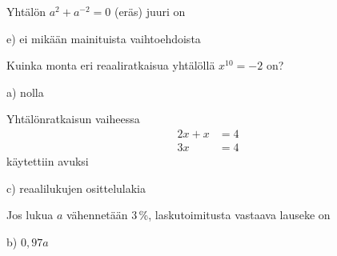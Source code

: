 \begin{tehtava} %
Yhtälön $a^2+a^{-2}=0$ (eräs) juuri on
	\begin{vastaus}
e) ei mikään mainituista vaihtoehdoista
	\end{vastaus}
\end{tehtava}

\begin{tehtava}
Kuinka monta eri reaaliratkaisua yhtälöllä $x^{10}=-2$ on?
	\begin{vastaus}
a) nolla
	\end{vastaus}
\end{tehtava}

\begin{tehtava}
Yhtälönratkaisun vaiheessa
\begin{align*}
2x+x&=4 \\
3x&=4
\end{align*}
käytettiin avuksi
	\begin{vastaus}
	c) reaalilukujen osittelulakia
	\end{vastaus}
\end{tehtava}

%
%	
%
%
%	
%
%
%	

\begin{tehtava}
Jos lukua $a$ vähennetään $3$\,\%, laskutoimitusta vastaava lauseke on
	\begin{vastaus}
b) $0,97a$
	\end{vastaus}
\end{tehtava}

